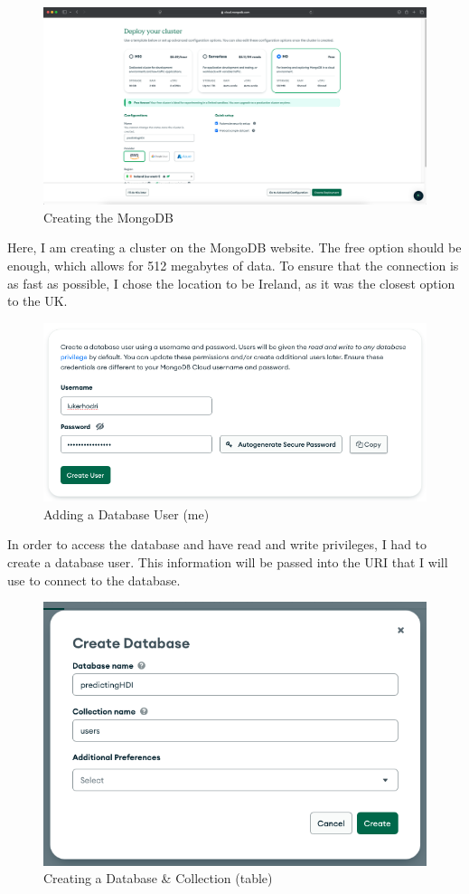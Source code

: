 \documentclass[12pt]{report}
\begin{document}
\begin{figure}[H]
\centering
\includegraphics[width=14cm]{ss15.1.png}
\caption{Creating the MongoDB}\label{fig:ss15.1}
\end{figure}

Here, I am creating a cluster on the MongoDB website. The free option should be enough, which allows for 512 megabytes of data. To ensure that the connection is as fast as possible, I chose the location to be Ireland, as it was the closest option to the UK.

\begin{figure}[H]
\centering
\includegraphics[width=12cm]{ss15.2.png}
\caption{Adding a Database User (me)}\label{fig:ss15.2}
\end{figure}

In order to access the database and have read and write privileges, I had to create a database user. This information will be passed into the URI that I will use to connect to the database.

\begin{figure}[H]
\centering
\includegraphics[width=12cm]{ss15.3.png}
\caption{Creating a Database \& Collection (table)}\label{fig:ss15.3}
\end{figure}
\end{document}
